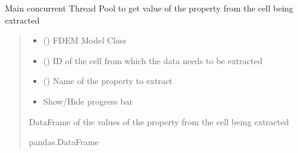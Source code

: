 \documentclass[letterpaper,10pt,english]{sphinxmanual}
\begin{document}

\begin{fulllineitems}
\label{\detokenize{pyfdempp:pyfdempp.extract_cell_thread_pool_generators.main}}
\pysigstartsignatures
{}
\pysigstopsignatures
\sphinxAtStartPar
Main concurrent Thread Pool to get value of the property from the cell being extracted
\begin{quote}\begin{description}
\begin{itemize}
\item {} 
\sphinxAtStartPar
{} () \textendash{} FDEM Model Class

\item {} 
\sphinxAtStartPar
{} () \textendash{} ID of the cell from which the data needs to be extracted

\item {} 
\sphinxAtStartPar
{} (\sphinxstyleliteralemphasis{\sphinxupquote{{[}}}\sphinxstyleliteralemphasis{\sphinxupquote{{]}}}) \textendash{} Name of the property to extract

\item {} 
\sphinxAtStartPar
{} \textendash{} Show/Hide progress bar

\end{itemize}

\sphinxAtStartPar
DataFrame of the values of the property from the cell being extracted

\sphinxAtStartPar
pandas.DataFrame

\end{description}\end{quote}

\end{fulllineitems}
\end{document}
